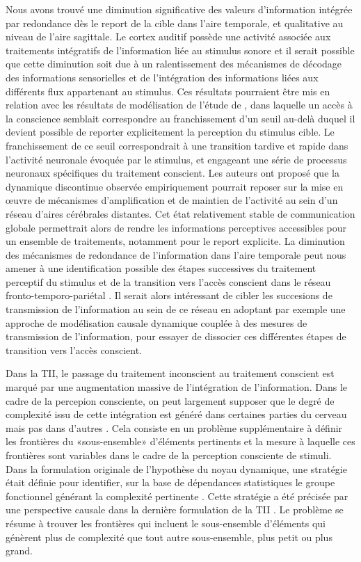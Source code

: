 Nous avons trouvé une diminution significative des valeurs d'information intégrée par redondance dès le report de la cible dans l'aire temporale, et qualitative au niveau de l'aire sagittale. 
Le cortex auditif possède une activité associée aux traitements intégratifs de l'information liée au stimulus sonore et il serait possible que cette diminution soit due à un ralentissement des mécanismes de décodage des informations sensorielles et de l'intégration des informations liées aux différents flux appartenant au stimulus. 
Ces résultats pourraient être mis en relation avec les résultats de modélisation de l'étude de \cite{sergent2005dynamique}, dans laquelle un accès à la conscience semblait correspondre au franchissement d'un seuil au-delà duquel il devient possible de reporter explicitement la perception du stimulus cible.
Le franchissement de ce seuil correspondrait à une transition tardive et rapide dans l’activité neuronale évoquée par le stimulus, et engageant une série de processus neuronaux spécifiques du traitement conscient. 
Les auteurs ont proposé que la dynamique discontinue observée empiriquement pourrait reposer sur la mise en œuvre de mécanismes d'amplification et de maintien de l’activité au sein d’un réseau d’aires cérébrales distantes. 
Cet état relativement stable de communication globale permettrait alors de rendre les informations perceptives accessibles pour un ensemble de traitements, notamment pour le report explicite. 
La diminution des mécanismes de redondance de l'information dans l'aire temporale peut nous amener à une identification possible des étapes successives du traitement perceptif du stimulus et de la transition vers l’accès conscient dans le réseau fronto-temporo-pariétal \citep{eriksson2007similar, eriksson2017activity, giani2015detecting}.
Il serait alors intéressant de cibler les succesions de transmission de l'information au sein de ce réseau en adoptant par exemple une approche de modélisation causale dynamique couplée à des mesures de transmission de l'information, pour essayer de dissocier ces différentes étapes de transition vers l'accès conscient. 

Dans la TII, le passage du traitement inconscient au traitement conscient est marqué par une augmentation massive de l'intégration de l'information. 
Dans le cadre de la percepion consciente, on peut largement supposer que le degré de complexité issu de cette intégration est généré dans certaines parties du cerveau mais pas dans d'autres \citep{sarasso2021consciousness}. 
Cela consiste en un problème supplémentaire à définir les frontières du «sous-ensemble» d'éléments pertinents et la mesure à laquelle ces frontières sont variables dans le cadre de la perception consciente de stimuli.  
Dans la formulation originale de l'hypothèse du noyau dynamique, une stratégie était définie pour identifier, sur la base de dépendances statistiques le groupe fonctionnel générant la complexité pertinente \citep{tononi1998consciousness}.
Cette stratégie a été précisée par une perspective causale dans la dernière formulation de la TII \citep{oizumi2014phenomenology}. 
Le problème se résume à trouver les frontières qui incluent le sous-ensemble d'éléments qui génèrent plus de complexité que tout autre sous-ensemble, plus petit ou plus grand. 

